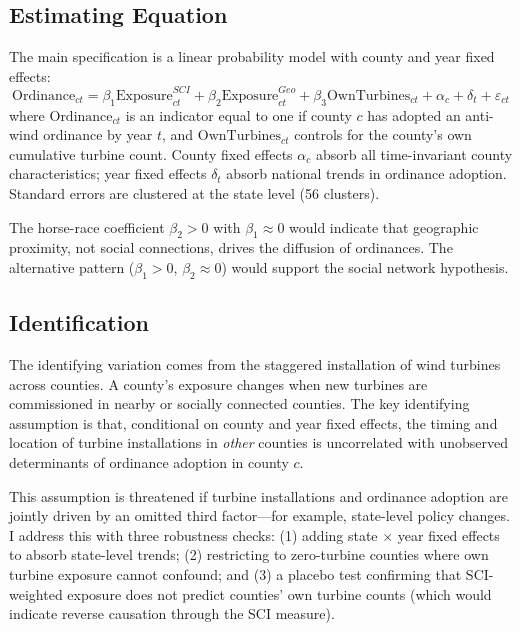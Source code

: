 \documentclass[12pt]{article}
\begin{document}
\subsection{Estimating Equation}

The main specification is a linear probability model with county and year fixed effects:
\begin{equation}
\text{Ordinance}_{ct} = \beta_1 \text{Exposure}_{ct}^{SCI} + \beta_2 \text{Exposure}_{ct}^{Geo} + \beta_3 \text{OwnTurbines}_{ct} + \alpha_c + \delta_t + \varepsilon_{ct}
\label{eq:main}
\end{equation}
where $\text{Ordinance}_{ct}$ is an indicator equal to one if county $c$ has adopted an anti-wind ordinance by year $t$, and $\text{OwnTurbines}_{ct}$ controls for the county's own cumulative turbine count. County fixed effects $\alpha_c$ absorb all time-invariant county characteristics; year fixed effects $\delta_t$ absorb national trends in ordinance adoption. Standard errors are clustered at the state level (56 clusters).

The horse-race coefficient $\beta_2 > 0$ with $\beta_1 \approx 0$ would indicate that geographic proximity, not social connections, drives the diffusion of ordinances. The alternative pattern ($\beta_1 > 0$, $\beta_2 \approx 0$) would support the social network hypothesis.

\subsection{Identification}

The identifying variation comes from the staggered installation of wind turbines across counties. A county's exposure changes when new turbines are commissioned in nearby or socially connected counties. The key identifying assumption is that, conditional on county and year fixed effects, the timing and location of turbine installations in \textit{other} counties is uncorrelated with unobserved determinants of ordinance adoption in county $c$.

This assumption is threatened if turbine installations and ordinance adoption are jointly driven by an omitted third factor---for example, state-level policy changes. I address this with three robustness checks: (1) adding state $\times$ year fixed effects to absorb state-level trends; (2) restricting to zero-turbine counties where own turbine exposure cannot confound; and (3) a placebo test confirming that SCI-weighted exposure does not predict counties' own turbine counts (which would indicate reverse causation through the SCI measure).
\end{document}
